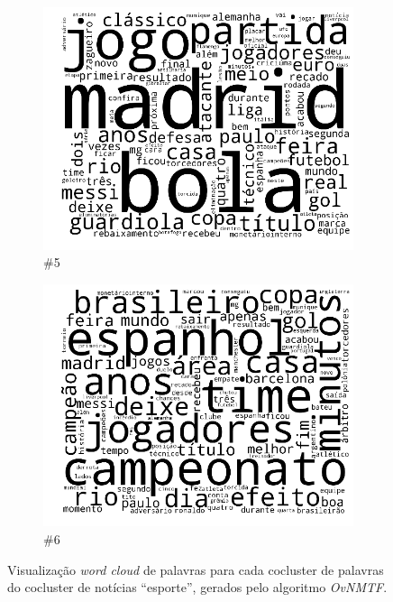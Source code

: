 \documentclass[
    12pt,                %
    oneside,            %
    a4paper,            %
    english,            %
    brazil                %
    ]{abntex2ppgsi}
\begin{document}
\begin{figure}[H]
\begin{subfigure}[b]{0.15\textwidth}
        \includegraphics[width=\textwidth]{img/ovnmtf-nc-3-tc-5.png}
        \caption{\#5}
    \end{subfigure}
    \begin{subfigure}[b]{0.15\textwidth}
        \includegraphics[width=\textwidth]{img/ovnmtf-nc-3-tc-6.png}
        \caption{\#6}
    \end{subfigure}

    \caption{Visualização \textit{word cloud} de palavras para cada cocluster de palavras do cocluster de notícias ``esporte'', gerados pelo algoritmo \textit{OvNMTF}.}
    \label{fig:ovnmtf:wordcloud-2}
\end{figure}
\end{document}
